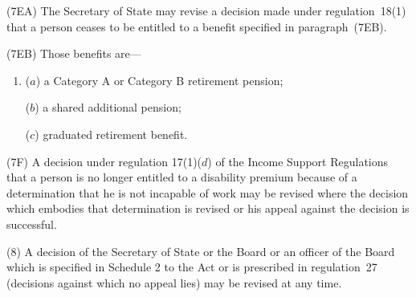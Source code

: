 \documentclass[12pt,a4paper]{article}
\begin{document}
(7EA) The Secretary of State may revise a decision made under regulation~18(1) that a person ceases to be entitled to a benefit specified in paragraph~(7EB).

(7EB) Those benefits are—
\begin{enumerate}\item[]
($a$) a Category A or Category B retirement pension;

($b$) a shared additional pension;

($c$) graduated retirement benefit.
\end{enumerate}

(7F) A decision under regulation 17(1)($d$)  of the Income Support Regulations that a person is no longer entitled to a disability premium because of a determination that he is not incapable of work may be revised where the decision which embodies that determination is revised or his appeal against the decision is successful.

(8) A decision of the Secretary of State 
or the Board or an officer of the Board  %
which is specified in Schedule 2 to the Act or is prescribed in regulation~27 (decisions against which no appeal lies) may be revised at any time.


\end{document}

